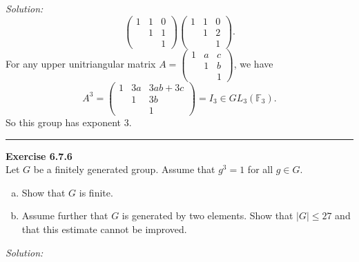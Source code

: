 \documentclass[a4paper, 12pt]{article}
\newenvironment{problem}[2][Exercise]
    { \begin{mdframed}[backgroundcolor=gray!20] \textbf{#1 #2} \\}
    {  \end{mdframed}}
\newenvironment{solution}
    {\textit{Solution:}}
    {}
\begin{document}
\begin{solution}
\[\begin{pmatrix}
    1&1&0\\ 
    &1&1\\ 
    &&1
\end{pmatrix}\begin{pmatrix}
    1&1&0\\ 
    &1&2\\ 
    &&1
\end{pmatrix}.\]
For any upper unitriangular matrix \(A=\begin{pmatrix}
    1&a&c\\ 
    &1&b\\ 
    &&1
\end{pmatrix}\), we have 
\[A^3=\begin{pmatrix}
    1& 3a&3ab+3c\\ 
    &1&3b\\ 
    &&1
\end{pmatrix}=I_3\in GL_3(\mathbb{F}_3).\] 
So this group has exponent \(3\).
\end{solution}

\noindent\rule{7in}{2.8pt}
\begin{problem}{6.7.6}
Let \(G\) be a finitely generated group. Assume that \(g^3=1\) for all \(g\in G\).
\begin{enumerate}[(a)]
\item Show that \(G\) is finite. 
\item Assume further that \(G\) is generated by two elements. Show that \(|G|\leq 27\) and that this estimate cannot be improved.
\end{enumerate}
\end{problem}
\begin{solution}

\end{solution}
\end{document}
